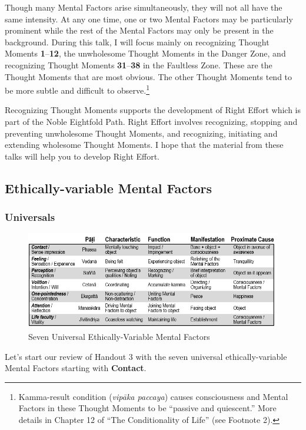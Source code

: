 Though many Mental Factors arise simultaneously, they will not all have the same intensity. At any one time, one or two Mental Factors may be particularly prominent while the rest of the Mental Factors may only be present in the background. During this talk, I will focus mainly on recognizing Thought Moments \textbf{1}--\textbf{12}, the unwholesome Thought Moments in the Danger Zone, and recognizing Thought Moments \textbf{31}--\textbf{38} in the Faultless Zone. These are the Thought Moments that are most obvious. The other Thought Moments tend to be more subtle and difficult to observe.\footnote{Kamma-result condition (\textit{vipāka paccaya}) causes consciousness and Mental Factors in these Thought Moments to be “passive and quiescent.” More details in Chapter 12 of “The Conditionality of Life” (see Footnote 2).}

Recognizing Thought Moments supports the development of Right Effort which is part of the Noble Eightfold Path. Right Effort involves recognizing, stopping and preventing unwholesome Thought Moments, and recognizing, initiating and extending wholesome Thought Moments. I hope that the material from these talks will help you to develop Right Effort.

\subsection*{Ethically-variable Mental Factors}

\subsubsection*{Universals}

\begin{figure}[h]
\centering
\includegraphics[width=0.8\linewidth]{./Diagrams/U-E}
\caption{Seven Universal Ethically-Variable Mental Factors}
\label{fig:U-E}
\end{figure}

Let’s start our review of Handout 3 with the seven universal ethically-variable Mental Factors starting with \textbf{Contact}.

